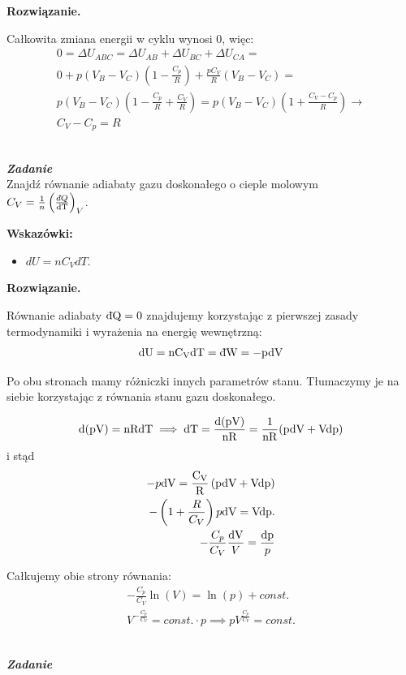 \documentclass[11pt,a4paper]{article}
\newcommand{\dbar} {\ensuremath{\,\mathchar'26\mkern-12mu d}}
\newcounter{zadanie}\newcommand{\zadanie}[1][]{\addtocounter{zadanie}{1} ~\\ {\bf \emph{Zadanie \arabic{zadanie} #1 }} \\}
\newenvironment{solution}{\vspace{1cm} \par\textbf{Rozwiązanie.} \vspace{1cm}}{}
\begin{document}
\begin{solution}
\begin{itemize}
\end{itemize}
Całkowita zmiana energii w cyklu wynosi $0$, więc:
\begin{align*}
	0 = \Delta U_{ABC} = \Delta U_{AB} + \Delta U_{BC} + \Delta U_{CA} = \\
   0 + p (V_B - V_C) \left(1 - \frac{C_p}{R} \right) + \frac{p C_V}{R}(V_B - V_C) = \\
    p (V_B -  V_C) \left(1 - \frac{C_p}{R} + \frac{C_V}{R} \right) = p (V_B - V_C) \left(1 + \frac{C_V - C_p}{R} \right) \to \\
    C_V - C_p = R
\end{align*}

\newpage   
\end{solution}
\zadanie[]

Znajdź równanie adiabaty gazu doskonałego o cieple molowym \\
$C_V = \frac{1}{n}\left( \frac{\dbar Q}{\rm{d}T}\right)_V$.

\vspace{0.2cm}

\textbf{Wskazówki:}
\begin{itemize}
  \item $dU = n C_V dT$.
\end{itemize}

\begin{solution}

Równanie adiabaty $\rm{\dbar} Q =0$ znajdujemy korzystając z pierwszej 
zasady termodynamiki  i wyrażenia na energię wewnętrzną:
\begin{align*}
\rm{d}U = n C_V \rm{d} T   = \dbar W = - p \rm{d}V
\end{align*}

Po obu stronach mamy różniczki innych parametrów stanu. Tłumaczymy je na siebie
korzystając z równania stanu gazu doskonałego.

\begin{align*}
\rm{d}(pV) = n R \rm{d} T \implies  \rm{d} T = \frac{\rm{d}(pV)}{n R} = \frac{1}{n R}(p\rm{d}V + V\rm{d}p  )
\end{align*}
i stąd
\begin{align*}
- p \rm{d}V  = \frac{C_V}{R}\left(  p \rm{d}V +  V \rm{d}p \right)\\
- \left( 1 + \frac{R}{C_V}\right) p \rm{d}V = V \rm{d}p. \\
-\frac{C_p}{C_V}\frac{\rm{d} V}{V}=\frac{\rm{d} p}{p}
\end{align*}

Całkujemy obie strony równania:
\begin{align*}
-\frac{C_p}{C_V}\ln(V) = \ln(p) + const. \\
V^{-\frac{C_p}{C_V}} = const. \cdot p \implies pV^{\frac{C_p}{C_V}} = const.
\end{align*}

\newpage   
\end{solution}
\zadanie[]
\end{document}

